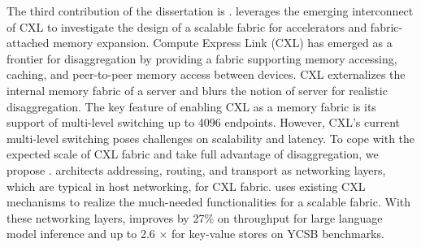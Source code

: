 The third contribution of the dissertation is \aurelia. 
\aurelia leverages the emerging interconnect of CXL to investigate the design of a scalable fabric for accelerators and fabric-attached memory expansion.
%
Compute Express Link (CXL) has emerged as a frontier for disaggregation by providing a fabric supporting memory accessing, caching, and peer-to-peer memory access between devices.
%
CXL externalizes the internal memory fabric of a server and blurs the notion of server for realistic disaggregation.
%
The key feature of enabling CXL as a memory fabric is its support of multi-level switching up to 4096 endpoints.
%
However, CXL's current multi-level switching poses challenges on scalability and latency. 
%
To cope with the expected scale of CXL fabric and take full advantage of disaggregation, we propose \aurelia.
%
\aurelia architects addressing, routing, and transport as networking layers, which are typical in host networking, for CXL fabric.
%
\aurelia uses existing CXL mechanisms to realize the much-needed functionalities for a scalable fabric.
%
With these networking layers, \aurelia improves by 27\% on throughput for large language model inference and up to 2.6 $\times$ for key-value stores on YCSB benchmarks.